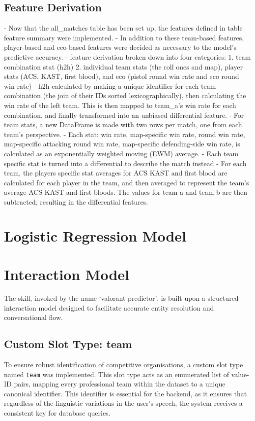 \subsection{Feature Derivation}
- Now that the all_matches table has been set up, the features defined in table feature summary were implemented.
- In addition to these team-based features, player-based and eco-based features were decided as necessary to the model's predictive accuracy.
- feature derivation broken down into four categories: 1. team combination stat (h2h) 2. individual team stats (the roll ones and map), player stats (ACS, KAST, first blood), and eco (pistol round win rate and eco round win rate)
- h2h calculated by making a unique identifier for each team combination (the join of their IDs sorted lexicographically), then calculating the win rate of the left team. This is then mapped to team_a's win rate for each combination, and finally transformed into an unbiased differential feature.
- For team stats, a new DataFrame is made with two rows per match, one from each team's perspective. 
- Each stat: win rate, map-specific win rate, round win rate, map-specific attacking round win rate, map-specific defending-side win rate, is calculated as an exponentially weighted moving (EWM) average.
- Each team specific stat is turned into a differential to describe the match instead
- For each team, the players specific stat averages for ACS KAST and first blood are calculated for each player in the team, and then averaged to represent the team's average ACS KAST and first bloods. The values for team a and team b are then subtracted, resulting in the differential features.

\section{Logistic Regression Model}

\section{Interaction Model}
The skill, invoked by the name `valorant predictor', is built upon a structured interaction model designed to facilitate accurate entity resolution and conversational flow.

\subsection{Custom Slot Type: team}
To ensure robust identification of competitive organisations, a custom slot type named \texttt{team} was implemented. This slot type acts as an enumerated list of value-ID pairs, mapping every professional team within the dataset to a unique canonical identifier. This identifier is essential for the backend, as it ensures that regardless of the linguistic variations in the user's speech, the system receives a consistent key for database queries.

